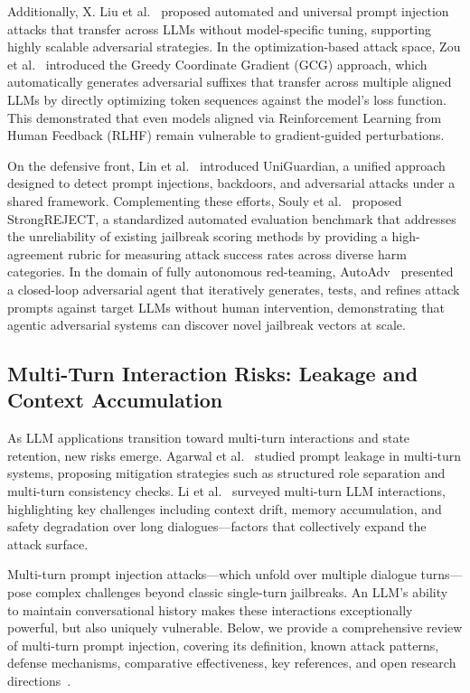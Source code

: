 \documentclass[10pt, a4paper, twocolumn]{article}
\begin{document}
Additionally, X. Liu et al.~\cite{liux2024universal} proposed automated and universal prompt injection attacks that transfer across LLMs without model-specific tuning, supporting highly scalable adversarial strategies. In the optimization-based attack space, Zou et al.~\cite{zou2023gcg} introduced the Greedy Coordinate Gradient (GCG) approach, which automatically generates adversarial suffixes that transfer across multiple aligned LLMs by directly optimizing token sequences against the model's loss function. This demonstrated that even models aligned via Reinforcement Learning from Human Feedback (RLHF) remain vulnerable to gradient-guided perturbations. 

On the defensive front, Lin et al.~\cite{lin2024uniguardian} introduced UniGuardian, a unified approach designed to detect prompt injections, backdoors, and adversarial attacks under a shared framework. Complementing these efforts, Souly et al.~\cite{souly2024strongreject} proposed StrongREJECT, a standardized automated evaluation benchmark that addresses the unreliability of existing jailbreak scoring methods by providing a high-agreement rubric for measuring attack success rates across diverse harm categories. In the domain of fully autonomous red-teaming, AutoAdv~\cite{autoadv2025} presented a closed-loop adversarial agent that iteratively generates, tests, and refines attack prompts against target LLMs without human intervention, demonstrating that agentic adversarial systems can discover novel jailbreak vectors at scale.

\subsection{Multi-Turn Interaction Risks: Leakage and Context Accumulation}
As LLM applications transition toward multi-turn interactions and state retention, new risks emerge. Agarwal et al.~\cite{agarwal2024} studied prompt leakage in multi-turn systems, proposing mitigation strategies such as structured role separation and multi-turn consistency checks. Li et al.~\cite{li2024} surveyed multi-turn LLM interactions, highlighting key challenges including context drift, memory accumulation, and safety degradation over long dialogues---factors that collectively expand the attack surface.

Multi-turn prompt injection attacks---which unfold over multiple dialogue turns---pose complex challenges beyond classic single-turn jailbreaks. An LLM's ability to maintain conversational history makes these interactions exceptionally powerful, but also uniquely vulnerable. Below, we provide a comprehensive review of multi-turn prompt injection, covering its definition, known attack patterns, defense mechanisms, comparative effectiveness, key references, and open research directions~\cite{huang2024, liu2023houyi}.
\end{document}

